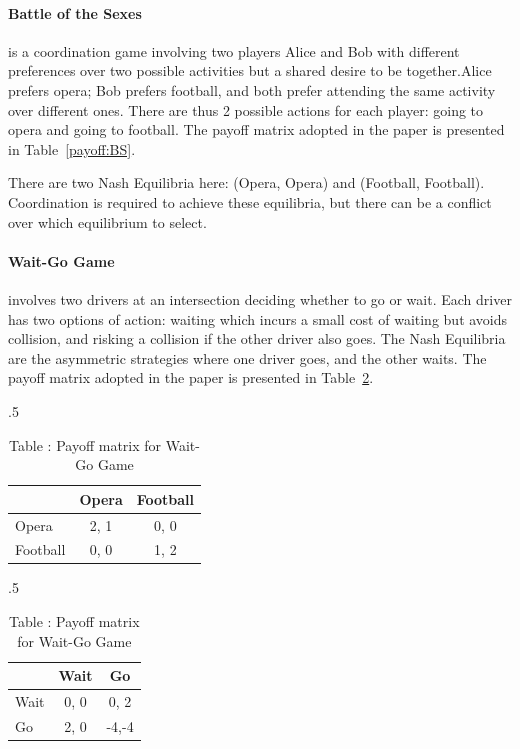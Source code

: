 \paragraph{Battle of the Sexes} is a coordination game involving two players Alice and Bob with different preferences over two possible activities but a shared desire to be together.Alice prefers opera; Bob prefers football, and both prefer attending the same activity over different ones. There are thus 2 possible actions for each player: going to opera and going to football. The payoff matrix adopted in the paper is presented in Table~\ref{payoff:BS}.

There are two Nash Equilibria here: (Opera, Opera) and (Football, Football). Coordination is required to achieve these equilibria, but there can be a conflict over which equilibrium to select.

\paragraph{Wait-Go Game} involves two drivers at an intersection deciding whether to go or wait. Each driver has two options of action: waiting which incurs a small cost of waiting but avoids collision, and risking a collision if the other driver also goes. The Nash Equilibria are the asymmetric strategies where one driver goes, and the other waits. The payoff matrix adopted in the paper is presented in Table~\ref{payoff:WG}.

\begin{table}[htb]%
    \begin{subtable}[t]{.5\textwidth}
        \centering
        \captionsetup{labelformat=empty}
            \begin{tabular}{l|cc}
                 & Opera & Football \\
                \toprule
                Opera & 2, 1 & 0, 0  \\
                Football & 0, 0 & 1, 2  \\
            \end{tabular}
        \caption{Table \thetable {}: Payoff matrix for Battle of Sexes}
        \label{payoff:BS}
    \end{subtable}%
   \begin{subtable}[t]{.5\textwidth}
        \centering
        \captionsetup{labelformat=empty}
        \begin{tabular}{l|cc}
                 & Wait & Go \\
                \toprule
                Wait & 0, 0 & \phantom{-}0, \phantom{-}2 \\
                Go & 2, 0 & -4,-4  \\
            \end{tabular}
        \caption{Table \thetable {}: Payoff matrix for Wait-Go Game}
    \label{payoff:WG}
    \end{subtable}
\end{table}


